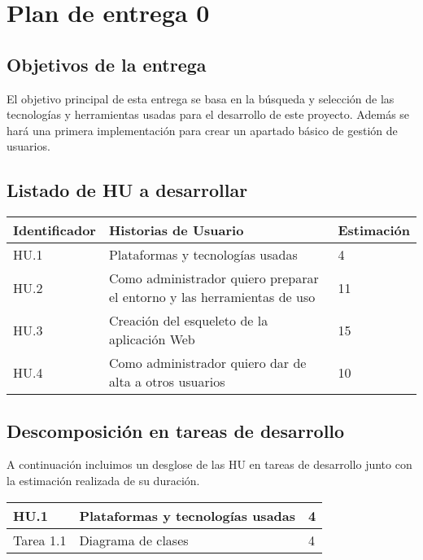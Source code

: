 \section{Plan de entrega 0}

\subsection{Objetivos de la entrega}

El objetivo principal de esta entrega se basa en la búsqueda y selección de las tecnologías y herramientas usadas para el desarrollo de este proyecto. Además se hará una primera implementación para crear un apartado básico de gestión de usuarios.

\subsection{Listado de HU a desarrollar}

\begin{table}[h]
	\centering
	\begin{tabular}{| p{2.3cm} | p{6.7cm} | p{2cm} |}
		\rowcolor[HTML]{329A9D} 
		{\color[HTML]{FFFFFF} \textbf{Identificador}} & {\color[HTML]{FFFFFF} \textbf{Historias de Usuario}} & {\color[HTML]{FFFFFF} \textbf{Estimación}}  \\ \hline
		HU.1 & Plataformas y tecnologías usadas & 4 \\ \hline   
		HU.2 & Como administrador quiero preparar el entorno y las herramientas de uso & 11 \\ \hline   
		HU.3 & Creación del esqueleto de la aplicación Web & 15 \\ \hline
		HU.4 & Como administrador quiero dar de alta a otros usuarios & 10 \\ \hline
	\end{tabular}
\end{table}

\newpage

\subsection{Descomposición en tareas de desarrollo}

A continuación incluimos un desglose de las HU en tareas de desarrollo junto con la estimación realizada de su duración.\\

\begin{table}[h]
	\centering
	\begin{tabular}{| p{2.3cm} | p{6.7cm} | p{2cm} |}
		\rowcolor[HTML]{329A9D} 
		{\color[HTML]{FFFFFF} \textbf{HU.1}} & {\color[HTML]{FFFFFF} \textbf{Plataformas y tecnologías usadas}} & {\color[HTML]{FFFFFF} \textbf{4}}  \\ \hline
		Tarea 1.1 & Diagrama de clases & 4 \\ \hline
	\end{tabular}
\end{table}

